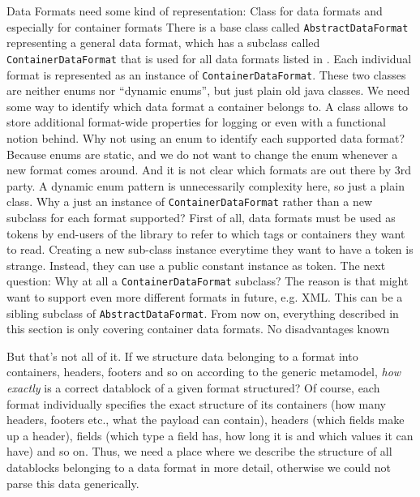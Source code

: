 Data Formats need some kind of representation:
{%
Class for data formats and especially for container formats
}
{%
There is a base class called \texttt{AbstractDataFormat} representing a general data format, which has a subclass called \texttt{ContainerDataFormat} that is used for all data formats listed in . Each individual format is represented as an instance of \texttt{ContainerDataFormat}. These two classes are neither enums nor ``dynamic enums'', but just plain old java classes.
}
{%
We need some way to identify which data format a container belongs to. A class allows to store additional format-wide properties for logging or even with a functional notion behind. Why not using an enum to identify each supported data format? Because enums are static, and we do not want to change the enum whenever a new format comes around. And it is not clear which formats are out there by 3rd party. A dynamic enum pattern is unnecessarily complexity here, so just a plain class. Why a just an instance of \texttt{ContainerDataFormat} rather than a new subclass for each format supported? First of all, data formats must be used as tokens by end-users of the library to refer to which tags or containers they want  to read. Creating a new sub-class instance everytime they want to have a token is strange. Instead, they can use a public constant instance as token. The next question: Why at all a \texttt{ContainerDataFormat} subclass? The reason is that \LibName{} might want to support even more different formats in future, e.g. XML. This can be a sibling subclass of \texttt{AbstractDataFormat}. From now on, everything described in this section is only covering container data formats.
}
{%
No disadvantages known
}

But that's not all of it. If we structure data belonging to a format into containers, headers, footers and so on according to the generic metamodel, \emph{how exactly} is a correct datablock of a given format structured? Of course, each format individually specifies the exact structure of its containers (how many headers, footers etc., what the payload can contain), headers (which fields make up a header), fields (which type a field has, how long it is and which values it can have) and so on. Thus, we need a place where we describe the structure of all datablocks belonging to a data format in more detail, otherwise we could not parse this data generically.

